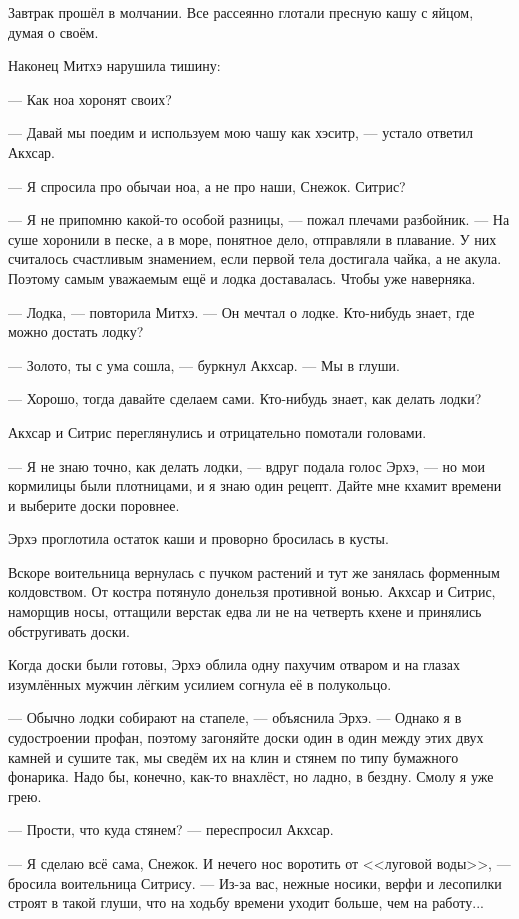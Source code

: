 Завтрак прошёл в молчании.
Все рассеянно глотали пресную кашу с яйцом, думая о своём.

Наконец Митхэ нарушила тишину:

--- Как ноа хоронят своих?

--- Давай мы поедим и используем мою чашу как хэситр, --- устало ответил Акхсар.

--- Я спросила про обычаи ноа, а не про наши, Снежок.
Ситрис?

--- Я не припомню какой-то особой разницы, --- пожал плечами разбойник.
--- На суше хоронили в песке, а в море, понятное дело, отправляли в плавание.
У них считалось счастливым знамением, если первой тела достигала чайка, а не акула.
Поэтому самым уважаемым ещё и лодка доставалась.
Чтобы уже наверняка.

--- Лодка, --- повторила Митхэ.
--- Он мечтал о лодке.
Кто-нибудь знает, где можно достать лодку?

--- Золото, ты с ума сошла, --- буркнул Акхсар.
--- Мы в глуши.

--- Хорошо, тогда давайте сделаем сами.
Кто-нибудь знает, как делать лодки?

Акхсар и Ситрис переглянулись и отрицательно помотали головами.

--- Я не знаю точно, как делать лодки, --- вдруг подала голос Эрхэ, --- но мои кормилицы были плотницами, и я знаю один рецепт.
Дайте мне кхамит времени и выберите доски поровнее.

Эрхэ проглотила остаток каши и проворно бросилась в кусты.

Вскоре воительница вернулась с пучком растений и тут же занялась форменным колдовством.
От костра потянуло донельзя противной вонью.
Акхсар и Ситрис, наморщив носы, оттащили верстак едва ли не на четверть кхене и принялись обстругивать доски.

Когда доски были готовы, Эрхэ облила одну пахучим отваром и на глазах изумлённых мужчин лёгким усилием согнула её в полукольцо.

--- Обычно лодки собирают на стапеле, --- объяснила Эрхэ.
--- Однако я в судостроении профан, поэтому загоняйте доски один в один между этих двух камней и сушите так, мы сведём их на клин и стянем по типу бумажного фонарика.
Надо бы, конечно, как-то внахлёст, но ладно, в бездну.
Смолу я уже грею.

--- Прости, что куда стянем? --- переспросил Акхсар.

--- Я сделаю всё сама, Снежок.
И нечего нос воротить от <<луговой воды>>, --- бросила воительница Ситрису.
--- Из-за вас, нежные носики, верфи и лесопилки строят в такой глуши, что на ходьбу времени уходит больше, чем на работу...

